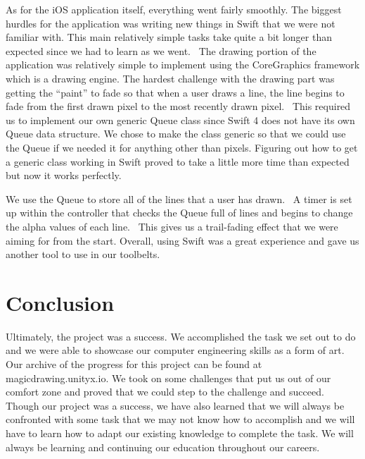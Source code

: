 \documentclass[12pt]{article}
\begin{document}
As for the iOS application itself, everything went fairly smoothly. The biggest hurdles for the application was writing new things in Swift that we were not familiar with. This main relatively simple tasks take quite a bit longer than expected since we had to learn as we went.  The drawing portion of the application was relatively simple to implement using the CoreGraphics framework which is a drawing engine.  The hardest challenge with the drawing part was getting the “paint” to fade so that when a user draws a line, the line begins to fade from the first drawn pixel to the most recently drawn pixel.  This required us to implement our own generic Queue class since Swift 4 does not have its own Queue data structure.  We chose to make the class generic so that we could use the Queue if we needed it for anything other than pixels. Figuring out how to get a generic class working in Swift proved to take a little more time than expected but now it works perfectly.

We use the Queue to store all of the lines that a user has drawn.  A timer is set up within the controller that checks the Queue full of lines and begins to change the alpha values of each line.  This gives us a trail-fading effect that we were aiming for from the start. Overall, using Swift was a great experience and gave us another tool to use in our toolbelts.

\section{Conclusion}
Ultimately, the project was a success. We accomplished the task we set out to do and we were able to showcase our computer engineering skills as a form of art. Our archive of the progress for this project can be found at magicdrawing.unityx.io. We took on some challenges that put us out of our comfort zone and proved that we could step to the challenge and succeed. Though our project was a success, we have also learned that we will always be confronted with some task that we may not know how to accomplish and we will have to learn how to adapt our existing knowledge to complete the task. We will always be learning and continuing our education throughout our careers.
\end{document}
